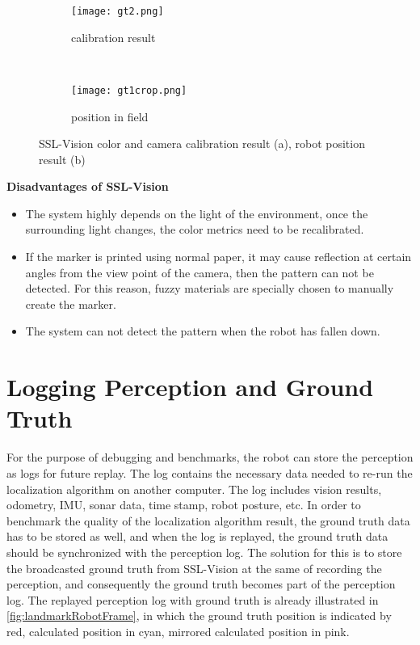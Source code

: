 \begin{figure}[h!]
        \centering
        \begin{subfigure}[h]{0.59\textwidth}
                \texttt{[image: gt2.png]}
                \caption{calibration result}
                \label{fig:calibration}
        \end{subfigure}%
        ~ %
        \begin{subfigure}[h]{0.41\textwidth}
                \texttt{[image: gt1crop.png]}
                \caption{position in field}
                \label{fig:position}
        \end{subfigure}%
	\caption[SSL-Vision color and camera calibration result, and robot position result]{SSL-Vision color and camera calibration result (a), robot position result (b)}
	\label{fig:sslVision result}
\end{figure}


\noindent\textbf{Disadvantages of SSL-Vision}
\begin{itemize}
  \item The system highly depends on the light of the environment, once the surrounding light changes, the color metrics need to be recalibrated. 
  \item If the marker is printed using normal paper, it may cause reflection at certain angles from the view point of the camera, then the pattern can not be detected. For this reason, fuzzy materials are specially chosen to manually create the marker. 
  \item The system can not detect the pattern when the robot has fallen down.
\end{itemize}

\section{Logging Perception and Ground Truth}
\label{sub:Logging Perception and Ground Truth}
For the purpose of debugging and benchmarks, the robot can store the perception as logs for future replay. The log contains the necessary data needed to re-run the localization algorithm on another computer. The log includes vision results, odometry, \gls{IMU}, sonar data, time stamp, robot posture, etc. In order to benchmark the quality of the localization algorithm result, the ground truth data has to be stored as well, and when the log is replayed, the ground truth data should be synchronized with the perception log. The solution for this is to store the broadcasted ground truth from SSL-Vision at the same of recording the perception, and consequently the ground truth becomes part of the perception log. The replayed perception log with ground truth is already illustrated in \autoref{fig:landmarkRobotFrame}, in which the ground truth position is indicated by red, calculated position in cyan, mirrored calculated position in pink.

